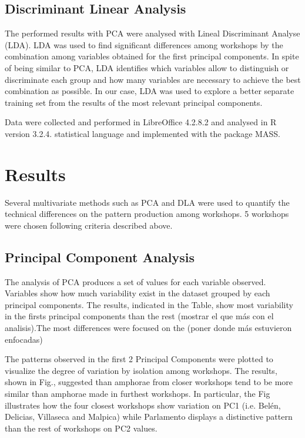 \documentclass[review]{elsarticle}
\begin{document}

\subsection{Discriminant Linear Analysis} 


The performed results with PCA were analysed with Lineal Discriminant Analyse (LDA). LDA was used to find significant differences among workshops by the combination among variables obtained for the first principal components. In spite of being similar to PCA, LDA identifies which variables allow to distinguish or discriminate each group and how many variables are necessary to achieve the best combination as possible. In our case, LDA was used to explore a better separate training set from the results of the most relevant principal components. 

Data were collected and performed in LibreOffice 4.2.8.2 and analysed in R version 3.2.4. statistical language and implemented with the package MASS. 


\section{Results}

Several multivariate methods such as PCA and DLA were used to quantify the technical differences on the pattern production among workshops. 5 workshops were chosen following criteria described above. 


\subsection{Principal Component Analysis}

The analysis of PCA produces a set of values for each variable observed. Variables show how much variability exist in the dataset grouped by each principal components. The results, indicated in the Table, show most variability in the firsts principal components than the rest (mostrar el que más con el analisis).The most differences were focused on the (poner donde más estuvieron enfocadas)

The patterns observed in the first 2 Principal Components were plotted to visualize the degree of variation by isolation among workshops. The results, shown in Fig., suggested than amphorae from closer workshops tend to be more similar than amphorae made in furthest workshops. In particular, the Fig illustrates how the four closest workshops show variation on PC1 (i.e. Belén, Delicias, Villaseca and Malpica) while Parlamento displays a distinctive pattern than the rest of workshops on PC2 values. 
\end{document}
